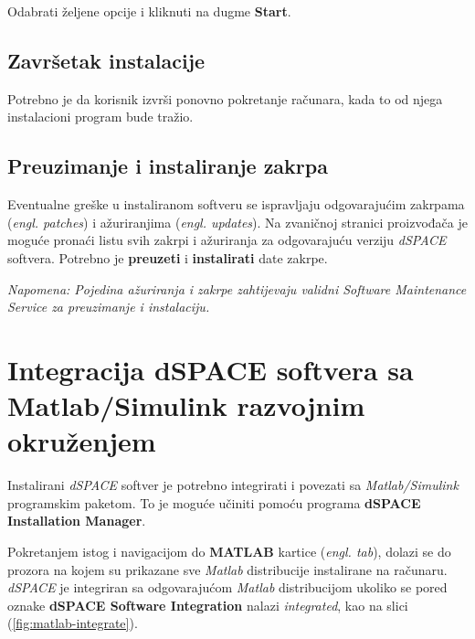 Odabrati željene opcije i kliknuti na dugme \textbf{Start}.

\subsection{Završetak instalacije}

\qquad Potrebno je da korisnik izvrši ponovno pokretanje računara, kada to od njega instalacioni program bude tražio.

\subsection{Preuzimanje i instaliranje zakrpa}

\qquad Eventualne greške u instaliranom softveru se ispravljaju odgovarajućim zakrpama (\textit{engl. patches}) i ažuriranjima (\textit{engl. updates}). Na zvaničnoj stranici proizvođača \citep{dSPACEpatch} je moguće pronaći listu svih zakrpi i ažuriranja za odgovarajuću verziju \textit{dSPACE} softvera. Potrebno je \textbf{preuzeti} i \textbf{instalirati} date zakrpe.

\textit{Napomena: Pojedina ažuriranja i zakrpe zahtijevaju validni \textit{Software Maintenance Service} za preuzimanje i instalaciju.}

\section{Integracija dSPACE softvera sa Matlab/Simulink razvojnim okruženjem}

\qquad Instalirani \textit{dSPACE} softver je potrebno integrirati i povezati sa \textit{Matlab/Simulink} programskim paketom. To je moguće učiniti pomoću programa \textbf{dSPACE Installation Manager}.

Pokretanjem istog i navigacijom do \textbf{MATLAB} kartice (\textit{engl. tab}), dolazi se do prozora na kojem su prikazane sve \textit{Matlab} distribucije instalirane na računaru. \textit{dSPACE} je integriran sa odgovarajućom \textit{Matlab} distribucijom ukoliko se pored oznake \textbf{dSPACE Software Integration} nalazi \textit{integrated}, kao na slici (\ref{fig:matlab-integrate}).

